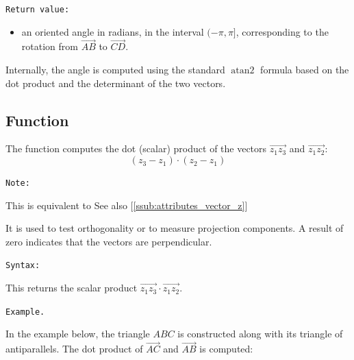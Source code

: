 \medskip
\texttt{Return value: }
\begin{itemize}
  \item an oriented angle in radians, in the interval $(-\pi, \pi]$, corresponding to the
        rotation from $\overrightarrow{AB}$ to $\overrightarrow{CD}$.
\end{itemize}

\medskip
Internally, the angle is computed using the standard $\operatorname{atan2}$ formula
based on the dot product and the determinant of the two vectors.





\subsection{Function }
\label{sub:dot_or_scalar_product}

The function  computes the dot (scalar) product of the vectors $\overrightarrow{z_1z_3}$ and $\overrightarrow{z_1z_2}$:
\[
(z_3 - z_1) \cdot (z_2 - z_1)
\]

\texttt{Note: }

 This is equivalent to  See also [\ref{ssub:attributes_vector_z}]
\label{par:note_dot}


It is used to test orthogonality or to measure projection components. A result of zero indicates that the vectors are perpendicular.

\medskip
\texttt{Syntax: }

\begin{center}
\end{center}
%
This returns the scalar product $\overrightarrow{z_1z_3} \cdot \overrightarrow{z_1z_2}$.

\texttt{Example.}

In the example below, the triangle $ABC$ is constructed along with its triangle of antiparallels. The dot product of $\overrightarrow{AC}$ and $\overrightarrow{AB}$ is computed:

